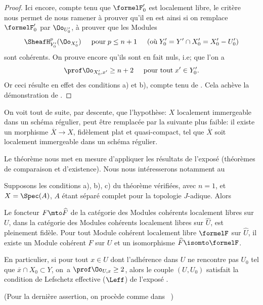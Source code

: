 \begin{proof}
\enlargethispage{\baselineskip}%
Ici encore, compte tenu que $\formelF_0'$ est localement libre, le crit\`ere ~ nous permet de nous ramener \`a prouver qu'il en est ainsi si on remplace $\formelF_0'$ par $\Oo_{U'_0}$, \ie \`a prouver que les Modules\pageoriginale
\[
\SheafH^p_{Y_0'}(\Oo_{X_0'}) \hspace{5mm} \text{pour} \; p\leq n+1 \hspace{5mm} \text{(o\`u} \; Y'_0=Y'\cap X_0'=X_0'- U'_0 \text{)}
\]
sont coh\'erents. On prouve encore qu'ils sont en fait nuls, i.e; que l'on a
\steco
\begin{equation} \label{eq:XII.25} {}\prof \Oo_{X'_0, x'} \geq n+2 \hspace{5mm} \text{pour tout} \; x'\in Y'_0.
\end{equation}
Or ceci r\'esulte en effet des conditions a) et b), compte tenu de . Cela ach\`eve la d\'emonstration de .
\skipqed
\end{proof}

\begin{remarque} \label{XII.4.3}
On voit tout de suite, par descente, que l'hypoth\`ese: $X$ localement immergeable dans un sch\'ema r\'egulier, peut \^etre remplac\'ee par la suivante plus faible: il existe un morphisme $\overline{X}\to X$, fid\`element plat et quasi-compact, tel que $\overline{X}$ soit localement immergeable dans un sch\'ema r\'egulier.
\end{remarque}

Le th\'eor\`eme  nous met en mesure d'appliquer les r\'esultats de l'expos\'e  (th\'eor\`emes de comparaison et d'existence). Nous nous int\'eresserons notamment au

\begin{corollaire} \label{XII.4.4}
Supposons les conditions a), b), c) du th\'eor\`eme  v\'erifi\'ees, avec $n=1$, et $X=\Spec(A)$, $A$ \'etant s\'epar\'e complet pour la topologie $J$-adique. Alors
\begin{enumerate}
\sisi{\item[\textup{1\noo})]}{\item} Le foncteur $F\mto \widehat{F}$ de la cat\'egorie des Modules coh\'erents localement libres sur~$U$, dans la cat\'egorie des Modules coh\'erents localement libres sur $\widehat{U}$, est pleinement fid\`ele. \sisi{\item[\textup{2\noo})]}{\item} Pour tout Module coh\'erent localement libre $\formelF$ sur $\widehat{U}$, il existe un Module coh\'erent $F$ sur $U$ et un isomorphisme $\widehat{F}\isomto \formelF$.
\end{enumerate}
En particulier, si pour tout $x\in U$ dont l'adh\'erence dans $U$ ne rencontre pas $U_0$ \ie tel que $\overline{x}\cap X_0\subset Y$, on~a $\prof \Oo_{U, x}\geq 2$, alors le couple $(U, U_0)$ satisfait la condition de Lefschetz effective ($\Leff$) de l'expos\'e .
\end{corollaire}
\noindent
(Pour la derni\`ere assertion, on proc\`ede comme dans ~)

